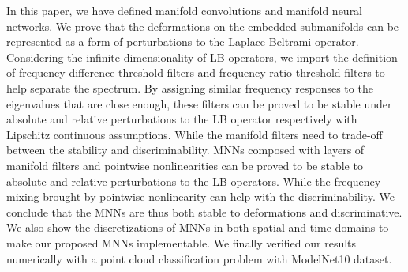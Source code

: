 In this paper, we have defined manifold convolutions and manifold neural networks. We prove that the deformations on the embedded submanifolds can be represented as a form of perturbations to the Laplace-Beltrami operator. Considering the infinite dimensionality of LB operators, we import the definition of frequency difference threshold filters and frequency ratio threshold filters to help separate the spectrum. By assigning similar frequency responses to the eigenvalues that are close enough, these filters can be proved to be stable under absolute and relative perturbations to the LB operator respectively with Lipschitz continuous assumptions. While the manifold filters need to trade-off between the stability and discriminability.  MNNs composed with layers of manifold filters and pointwise nonlinearities can be proved to be stable to absolute and relative perturbations to the LB operators. While the frequency mixing brought by pointwise nonlinearity can help with the discriminability. We conclude that the MNNs are thus both stable to deformations and discriminative. We also show the discretizations of MNNs in both spatial and time domains to make our proposed MNNs implementable. 
We finally verified our results numerically with a point cloud classification problem with ModelNet10 dataset.